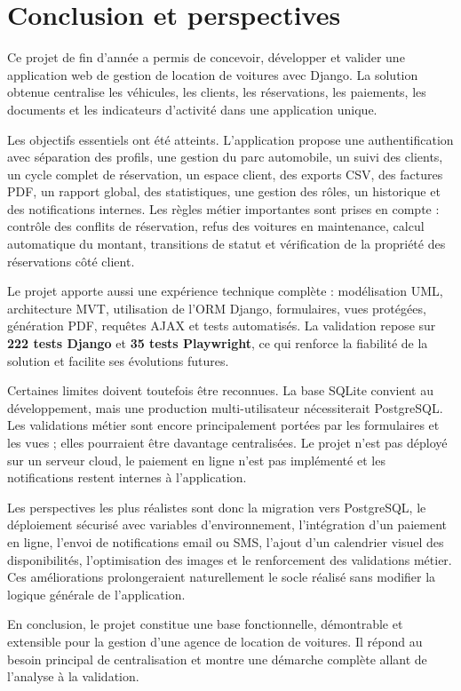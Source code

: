 \chapter{Conclusion et perspectives}

Ce projet de fin d'année a permis de concevoir, développer et valider une application web de gestion de location de voitures avec Django. La solution obtenue centralise les véhicules, les clients, les réservations, les paiements, les documents et les indicateurs d'activité dans une application unique.

Les objectifs essentiels ont été atteints. L'application propose une authentification avec séparation des profils, une gestion du parc automobile, un suivi des clients, un cycle complet de réservation, un espace client, des exports CSV, des factures PDF, un rapport global, des statistiques, une gestion des rôles, un historique et des notifications internes. Les règles métier importantes sont prises en compte : contrôle des conflits de réservation, refus des voitures en maintenance, calcul automatique du montant, transitions de statut et vérification de la propriété des réservations côté client.

Le projet apporte aussi une expérience technique complète : modélisation UML, architecture MVT, utilisation de l'ORM Django, formulaires, vues protégées, génération PDF, requêtes AJAX et tests automatisés. La validation repose sur \textbf{222 tests Django} et \textbf{35 tests Playwright}, ce qui renforce la fiabilité de la solution et facilite ses évolutions futures.

Certaines limites doivent toutefois être reconnues. La base SQLite convient au développement, mais une production multi-utilisateur nécessiterait PostgreSQL. Les validations métier sont encore principalement portées par les formulaires et les vues ; elles pourraient être davantage centralisées. Le projet n'est pas déployé sur un serveur cloud, le paiement en ligne n'est pas implémenté et les notifications restent internes à l'application.

Les perspectives les plus réalistes sont donc la migration vers PostgreSQL, le déploiement sécurisé avec variables d'environnement, l'intégration d'un paiement en ligne, l'envoi de notifications email ou SMS, l'ajout d'un calendrier visuel des disponibilités, l'optimisation des images et le renforcement des validations métier. Ces améliorations prolongeraient naturellement le socle réalisé sans modifier la logique générale de l'application.

En conclusion, le projet constitue une base fonctionnelle, démontrable et extensible pour la gestion d'une agence de location de voitures. Il répond au besoin principal de centralisation et montre une démarche complète allant de l'analyse à la validation.
